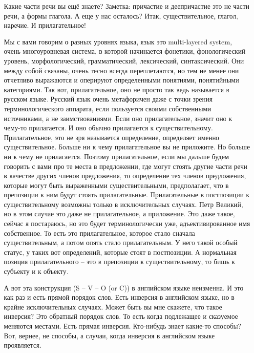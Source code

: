 \documentclass[main.tex]{subfiles}
\begin{document}
Какие части речи вы ещё знаете?
Заметка: причастие и деепричастие это не части речи, а формы глагола.
А еще у нас осталось?
Итак, существительное, глагол, наречие. И прилагательное!

Мы с вами говорим о разных уровнях языка, язык это multi-layered system, очень многоуровневая система, в которой начинается фонетики, фонологический уровень, морфологический, грамматический, лексический, синтаксический.
Они между собой связаны, очень тесно всегда переплетаются, но тем не менее они отчетливо выражаются и оперируют определенными понятиями, понятийными категориями.
Так вот, прилагательное, оно не просто так ведь называется в русском языке.
Русский язык очень метафоричен даже с точки зрения терминологического аппарата, если пользуется своими собственными источниками, а не заимствованиями.
Если оно прилагательное, значит оно к чему-то прилагается.
И оно обычно прилагается к существительному.
Прилагательное, это не зря называется определение, определяет именно существительное.
Больше ни к чему прилагательное вы не приложите.
Но больше ни к чему не прилагается.
Поэтому прилагательное, если мы дальше будем говорить с вами про те места в предложении, где могут стоять другие части речи в качестве других членов предложения, то определение тех членов предложения, которые могут быть выраженными существительными, предполагает, что в препозиции к ним будут стоять прилагательные.
Прилагательные в постпозиции к существительному возможны только в исключительных случаях.
Петр Великий, но в этом случае это даже не прилагательное, а приложение.
Это даже такое, сейчас я постараюсь, но это будет терминологически уже, адъективированное имя собственное.
То есть это прилагательное, которое стало сначала существительным, а потом опять стало прилагательным.
У него такой особый статус, у таких вот определений, которые стоят в постпозиции.
А нормальная позиция прилагательного -- это в препозиции к существительному, то бишь к субъекту и к объекту.

А вот эта конструкция (S -- V -- O (or C)) в английском языке неизменна.
И это как раз и есть прямой порядок слов.
Есть инверсия в английском языке, но в крайне исключительных случаях.
Может быть вы мне скажете, что такое инверсия?
Это обратный порядок слов.
То есть когда подлежащее и сказуемое меняются местами.
Есть прямая инверсия.
Кто-нибудь знает какие-то способы?
Вот, вернее, не способы, а случаи, когда инверсия в английском языке проявляется.
\end{document}
